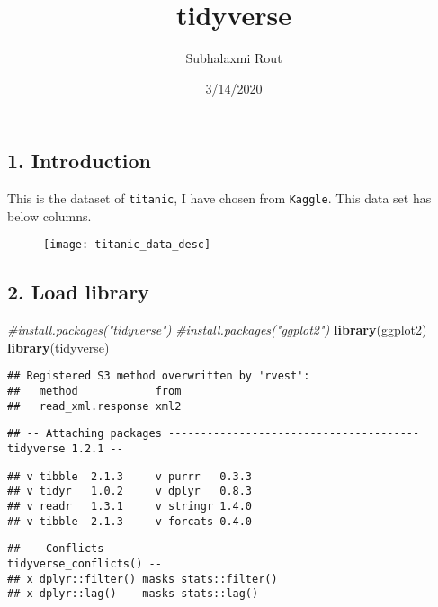 \documentclass[
]{article}
\title{tidyverse}
\author{Subhalaxmi Rout}
\date{3/14/2020}
\newenvironment{Shaded}{\begin{snugshade}}{\end{snugshade}}
\newcommand{\CommentTok}[1]{\textcolor[rgb]{0.56,0.35,0.01}{\textit{#1}}}
\newcommand{\KeywordTok}[1]{\textcolor[rgb]{0.13,0.29,0.53}{\textbf{#1}}}
\newcommand{\NormalTok}[1]{#1}
\begin{document}
\maketitle

{
\setcounter{tocdepth}{2}
\tableofcontents
}
\hypertarget{introduction}{%
\subsection{1. Introduction}\label{introduction}}

This is the dataset of \texttt{titanic}, I have chosen from
\texttt{Kaggle}. This data set has below columns.

\begin{figure}
\texttt{[image: titanic\_data\_desc]} \end{figure}

\hypertarget{load-library}{%
\subsection{2. Load library}\label{load-library}}

\begin{Shaded}
\begin{Highlighting}[]
\CommentTok{#install.packages("tidyverse")}
\CommentTok{#install.packages("ggplot2")}
\KeywordTok{library}\NormalTok{(ggplot2)}
\KeywordTok{library}\NormalTok{(tidyverse)}
\end{Highlighting}
\end{Shaded}

\begin{verbatim}
## Registered S3 method overwritten by 'rvest':
##   method            from
##   read_xml.response xml2
\end{verbatim}

\begin{verbatim}
## -- Attaching packages --------------------------------------- tidyverse 1.2.1 --
\end{verbatim}

\begin{verbatim}
## v tibble  2.1.3     v purrr   0.3.3
## v tidyr   1.0.2     v dplyr   0.8.3
## v readr   1.3.1     v stringr 1.4.0
## v tibble  2.1.3     v forcats 0.4.0
\end{verbatim}

\begin{verbatim}
## -- Conflicts ------------------------------------------ tidyverse_conflicts() --
## x dplyr::filter() masks stats::filter()
## x dplyr::lag()    masks stats::lag()
\end{verbatim}
\end{document}

